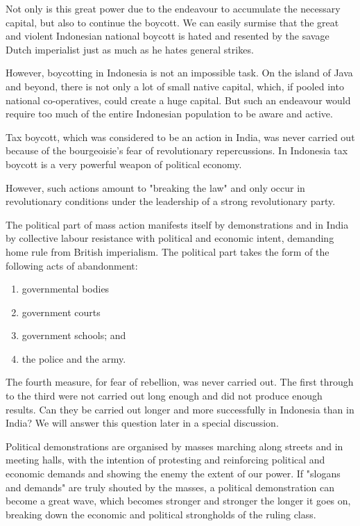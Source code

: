 Not only is this great power due to the endeavour to accumulate the necessary capital, but also to continue the boycott. 
We can easily surmise that the great and violent Indonesian national boycott is hated and resented by the savage Dutch imperialist 
just as much as he hates general strikes.\nline

However, boycotting in Indonesia is not an impossible task. On the island of Java and beyond, there is not only a lot of small native capital, 
which, if pooled into national co-operatives, could create a huge capital. But such an endeavour would require too much of the entire 
Indonesian population to be aware and active.\nline

Tax boycott, which was considered to be an action in India, was never carried out because of the bourgeoisie's fear of revolutionary 
repercussions. In Indonesia tax boycott is a very powerful weapon of political economy.\nline

However, such actions amount to "breaking the law" and only occur in revolutionary conditions under the leadership of a strong revolutionary party.\nline

The political part of mass action manifests itself by demonstrations and in India by collective labour resistance with political 
and economic intent, demanding home rule from British imperialism. The political part takes the form of the following acts of abandonment:\nline

\begin{enumerate}
    \item governmental bodies
    \item government courts
    \item government schools; and
    \item the police and the army.
\end{enumerate}

The fourth measure, for fear of rebellion, was never carried out. The first through to the third were not carried out long enough and 
did not produce enough results. Can they be carried out longer and more successfully in Indonesia than in India? We will answer this 
question later in a special discussion.\nline

Political demonstrations are organised by masses marching along streets and in meeting halls, with the intention of protesting and 
reinforcing political and economic demands and showing the enemy the extent of our power. If "slogans and demands" are truly shouted by 
the masses, a political demonstration can become a great wave, which becomes stronger and stronger the longer it goes on, breaking down 
the economic and political strongholds of the ruling class.\nline

